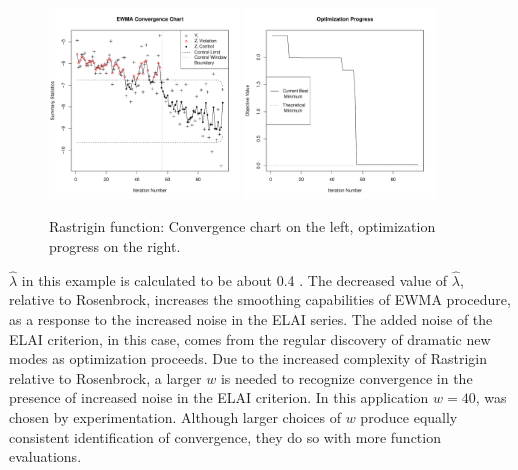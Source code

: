 \documentclass[12pt]{article}
\def \rastLamb {
        0.4
}
\begin{document}
%
%
\begin{figure}[!htb]
        \centering
        \includegraphics[width=0.45\textwidth]{./figures/ewmaConvChartRastHardBW.pdf}
        \includegraphics[width=0.45\textwidth]{./figures/bestZRastHardEnd.pdf}
        \caption{Rastrigin function: Convergence chart on the left, optimization progress on the right.}
        \label{fig:rastrigin}
\end{figure}
%
%

%
$\hat\lambda$ in this example is calculated to be about \rastLamb.
%
The decreased value of $\hat\lambda$, relative to Rosenbrock, increases the smoothing capabilities of EWMA procedure, as a response to the increased noise in the ELAI series. %
%
The added noise of the ELAI criterion, in this case, comes from the regular discovery of dramatic new modes as optimization proceeds.
%
Due to the increased complexity of Rastrigin relative to Rosenbrock, a larger $w$ is needed to recognize convergence in the presence of increased noise in the ELAI criterion. 
%
In this application $w=40$, was chosen by experimentation.
%
Although larger choices of $w$ produce equally consistent identification of convergence, they do so with more function evaluations.
\end{document}
